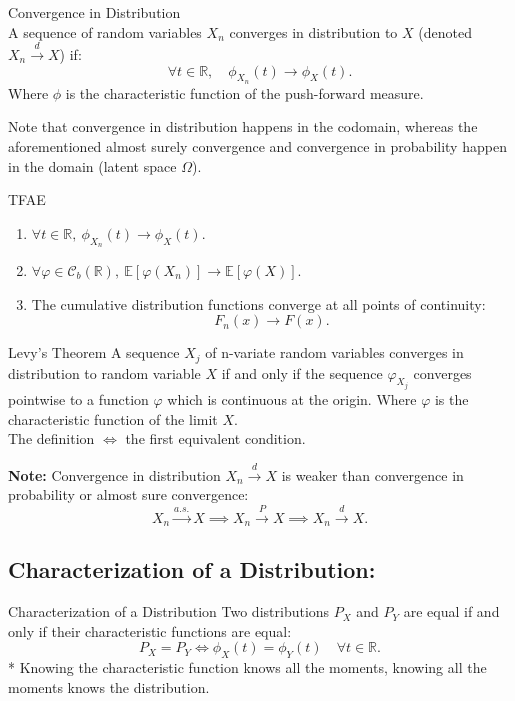 \begin{prf}
\begin{df}{Convergence in Distribution}\\
A sequence of random variables $X_n$ converges in distribution to $X$ (denoted $X_n \xrightarrow{d} X$) if:
\[
\forall t \in \mathbb{R}, \quad \phi_{X_n}(t) \to \phi_X(t).
\]
\noindent Where $\phi$ is the characteristic function of the push-forward measure.	
\end{df}
\begin{rmk}{}
	Note that convergence in distribution happens in the codomain, whereas the aforementioned almost surely convergence and convergence in probability happen in the domain (latent space $\Omega$). 
\end{rmk}



\begin{prop}{TFAE}
\begin{enumerate}
    \item $\forall t \in \mathbb{R}, \ \phi_{X_n}(t) \to \phi_X(t)$.
    \item $\forall \varphi \in \mathscr{C}_b(\mathbb{R}), \ \mathbb{E}[\varphi(X_n)] \to \mathbb{E}[\varphi(X)]$.
    \item The cumulative distribution functions converge at all points of continuity:
    \[
    F_n(x) \to F(x).
    \]
\end{enumerate}	
\end{prop}

\begin{thm}{Levy's Theorem}
	 A sequence $X_j$ of n-variate random variables converges in distribution to random variable $X$ if and only if the sequence $\varphi_{X_j}$ converges pointwise to a function $\varphi$ which is continuous at the origin. Where $\varphi$  is the characteristic function of the limit $X$.\\
	 
	 The definition $\Leftrightarrow$ the first equivalent condition.  
\end{thm}


\noindent \textbf{Note:} Convergence in distribution $X_n \xrightarrow{d} X$ is weaker than convergence in probability or almost sure convergence:
\[
X_n \xrightarrow{a.s.} X \implies X_n \xrightarrow{P} X \implies X_n \xrightarrow{d} X.
\]

\subsection{Characterization of a Distribution:}
\begin{thm}{Characterization of a Distribution}
Two distributions $P_X$ and $P_Y$ are equal if and only if their characteristic functions are equal:
\[
P_X = P_Y \iff \phi_X(t) = \phi_Y(t) \quad \forall t \in \mathbb{R}.
\]
* Knowing the characteristic function knows all the moments, knowing all the moments knows the distribution. 
\end{thm}



\end{prf}
